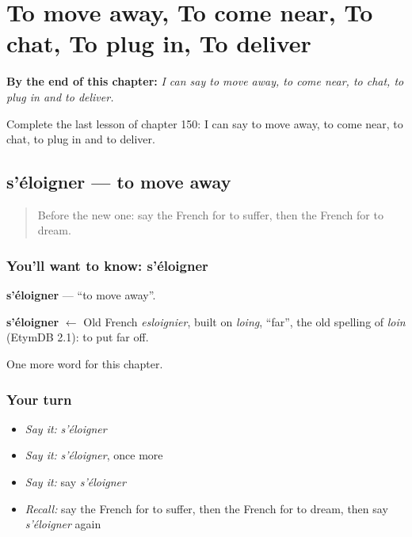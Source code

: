 
\chapter{To move away, To come near, To chat, To plug in, To deliver}
\label{ch:fr-to-move-away-to-come-near-to-chat-to-plug-in-to-deliver}

\begin{chapteropening}
\textbf{By the end of this chapter:} \emph{I can say to move away, to come near, to chat, to plug in and to deliver.}

Complete the last lesson of chapter 150: I can say to move away, to come near, to chat, to plug in and to deliver.
\end{chapteropening}

\section[s'éloigner]{s'éloigner — to move away}

\label{lesson:FR-C150-eloigner}



\begin{quote}
Before the new one: say the French for to suffer, then the French for to dream.
\end{quote}

\subsection*{You'll want to know: s'éloigner}
\textbf{s'éloigner} — \textquotedblleft{}to move away\textquotedblright{}.

\begin{cousinweb}
\textbf{s'éloigner} $\leftarrow$ Old French \emph{esloignier}, built on \emph{loing}, \textquotedblleft{}far\textquotedblright{}, the old spelling of \emph{loin} (EtymDB 2.1): to put far off.
\end{cousinweb}

\begin{grammarlens}[title={What you've built}]
One more word for this chapter.
\end{grammarlens}

\subsection*{Your turn}
\begin{itemize}
\raggedright
  \item \emph{Say it:} \emph{s'éloigner}
  \item \emph{Say it:} \emph{s'éloigner}, once more
  \item \emph{Say it:} say \emph{s'éloigner}
  \item \emph{Recall:} say the French for to suffer, then the French for to dream, then say \emph{s'éloigner} again
\end{itemize}

